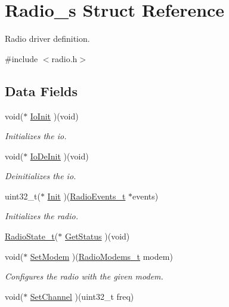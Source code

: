 \hypertarget{structRadio__s}{}\section{Radio\+\_\+s Struct Reference}
\label{structRadio__s}


Radio driver definition.  




{\ttfamily \#include $<$radio.\+h$>$}

\subsection*{Data Fields}
\begin{DoxyCompactItemize}
\item 
void($\ast$ \hyperlink{group__LORA_ga5a84db3f810c3c6470a330034981fc7b}{Io\+Init} )(void)
\begin{DoxyCompactList}\small\item\em Initializes the io. \end{DoxyCompactList}\item 
void($\ast$ \hyperlink{group__LORA_ga45d0a08fcddbc5d8364ce980c26028ac}{Io\+De\+Init} )(void)
\begin{DoxyCompactList}\small\item\em Deinitializes the io. \end{DoxyCompactList}\item 
uint32\+\_\+t($\ast$ \hyperlink{group__LORA_gafb896d98cceb49c55af00f5d5aa964cd}{Init} )(\hyperlink{structRadioEvents__t}{Radio\+Events\+\_\+t} $\ast$events)
\begin{DoxyCompactList}\small\item\em Initializes the radio. \end{DoxyCompactList}\item 
\hyperlink{group__LORA_ga2f3fa4ad0237c4ace94aa99086aac9f5}{Radio\+State\+\_\+t}($\ast$ \hyperlink{group__LORA_ga24c01d8388f399e8ccaea190048eea9d}{Get\+Status} )(void)
\item 
void($\ast$ \hyperlink{group__LORA_ga92515d5b16f5093727b90256a8929b82}{Set\+Modem} )(\hyperlink{group__LORA_ga992ef7a5b7f52975ba7bd8dd97740057}{Radio\+Modems\+\_\+t} modem)
\begin{DoxyCompactList}\small\item\em Configures the radio with the given modem. \end{DoxyCompactList}\item 
void($\ast$ \hyperlink{group__LORA_gaf41c78922a5831b2e0ceb458286846fd}{Set\+Channel} )(uint32\+\_\+t freq)

\end{DoxyCompactItemize}
